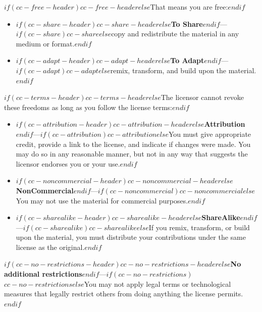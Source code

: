    \scriptsize
   \noindent \sansfont
    $if(cc-free-header)$$cc-free-header$$else$That means you are free:$endif$
      \begin{itemize}
        \setlength{\itemsep}{0pt}
        \setlength{\parskip}{0pt}
        \setlength{\parsep}{0pt}
          \item \textbf{$if(cc-share-header)$$cc-share-header$$else$To Share$endif$}---$if(cc-share)$$cc-share$$else$copy and redistribute the material in any medium or format.$endif$
         \item \textbf{$if(cc-adapt-header)$$cc-adapt-header$$else$To Adapt$endif$}---$if(cc-adapt)$$cc-adapt$$else$remix, transform, and build upon the material.$endif$
      \end{itemize}
    $if(cc-terms-header)$$cc-terms-header$$else$The licensor cannot revoke these freedoms as long as you follow the license terms:$endif$ \par
      \begin{itemize}
        \setlength{\itemsep}{0pt}
        \setlength{\parskip}{0pt}
        \setlength{\parsep}{0pt}
          \item \textbf{$if(cc-attribution-header)$$cc-attribution-header$$else$Attribution$endif$}---$if(cc-attribution)$$cc-attribution$$else$You must give appropriate credit, provide a link to the license, and indicate if changes were made. You may do so in any reasonable manner, but not in any way that suggests the licensor endorses you or your use.$endif$ \par
          \item \textbf{$if(cc-noncommercial-header)$$cc-noncommercial-header$$else$NonCommercial$endif$}---$if(cc-noncommercial)$$cc-noncommercial$$else$You may not use the material for commercial purposes.$endif$ \par
          \item \textbf{$if(cc-sharealike-header)$$cc-sharealike-header$$else$ShareAlike$endif$}---$if(cc-sharealike)$$cc-sharealike$$else$If you remix, transform, or build upon the material, you must distribute your contributions under the same license as the original.$endif$ \par
      \end{itemize}
    \textbf{$if(cc-no-restrictions-header)$$cc-no-restrictions-header$$else$No additional restrictions$endif$}---$if(cc-no-restrictions)$$cc-no-restrictions$$else$You may not apply legal terms or technological measures that legally restrict others from doing anything the license permits.$endif$
    
